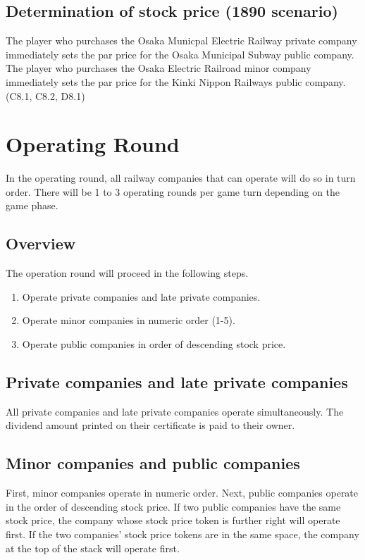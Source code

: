 \documentclass{article}
\begin{document}
\begin{CJK}{UTF8}{min}
\begin{multicols}{2}
\subsection{Determination of stock price (1890 scenario)}
The player who purchases the Osaka Municpal Electric Railway private
company immediately sets the par price for the Osaka Municipal Subway
public company. The player who purchases the Osaka Electric Railroad
minor company immediately sets the par price for the Kinki Nippon
Railways public company. (C8.1, C8.2, D8.1)



\section{Operating Round}
\resettocdepth
In the operating round, all railway companies that can operate will do
so in turn order. There will be 1 to 3 operating rounds per game turn
depending on the game phase.

\subsection{Overview}
The operation round will proceed in the following steps.
\begin{enumerate}
\item Operate private companies and late private companies.
\item Operate minor companies in numeric order (1-5).
\item Operate public companies in order of descending stock price.
\end{enumerate}

\subsection{Private companies and late private companies}
All private companies and late private companies operate
simultaneously.  The dividend amount printed on their certificate is
paid to their owner.

\subsection{Minor companies and public companies}
\label{or-operating-order}
First, minor companies operate in numeric order. Next, public
companies operate in the order of descending stock price. If two
public companies have the same stock price, the company whose stock
price token is further right will operate first. If the two companies'
stock price tokens are in the same space, the company at the top of
the stack will operate first.


\end{multicols}
\end{CJK}
\end{document}
